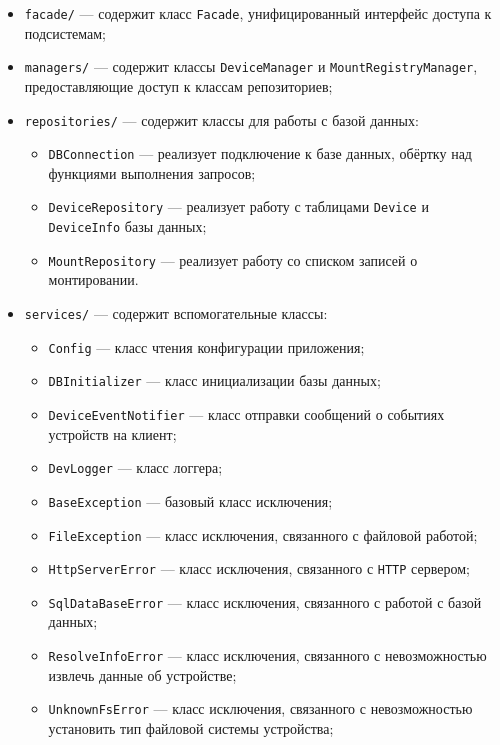 \begin{itemize}[label=---]
\begin{itemize}[label=---]
\begin{itemize}[label=---]
        \end{itemize}
        \item \texttt{facade/} --- содержит класс \texttt{Facade}, унифицированный интерфейс доступа к подсистемам;
        \item \texttt{managers/} --- содержит классы \texttt{DeviceManager} и \texttt{MountRegistryManager}, предоставляющие доступ к классам репозиториев;
        \item \texttt{repositories/} --- содержит классы для работы с базой данных:
        \begin{itemize}[label=---]
            \item \texttt{DBConnection} --- реализует подключение к базе данных, обёртку над функциями выполнения запросов;
            \item \texttt{DeviceRepository} --- реализует работу с таблицами \texttt{Device} и \texttt{DeviceInfo} базы данных;
            \item \texttt{MountRepository} --- реализует работу со списком записей о монтировании.
        \end{itemize}
        \item \texttt{services/} --- содержит вспомогательные классы:
        \begin{itemize}[label=---]
            \item \texttt{Config} --- класс чтения конфигурации приложения;
            \item \texttt{DBInitializer} --- класс инициализации базы данных;
            \item \texttt{DeviceEventNotifier} --- класс отправки сообщений о событиях устройств на клиент;
            \item \texttt{DevLogger} --- класс логгера;
            \item \texttt{BaseException} --- базовый класс исключения;
            \item \texttt{FileException} --- класс исключения, связанного с файловой работой;
            \item \texttt{HttpServerError} --- класс исключения, связанного с \texttt{HTTP} сервером;
            \item \texttt{SqlDataBaseError} --- класс исключения, связанного с работой с базой данных;
            \item \texttt{ResolveInfoError} --- класс исключения, связанного с невозможностью извлечь данные об устройстве;
            \item \texttt{UnknownFsError} --- класс исключения, связанного с невозможностью установить тип файловой системы устройства;

\end{itemize}
\end{itemize}
\end{itemize}
